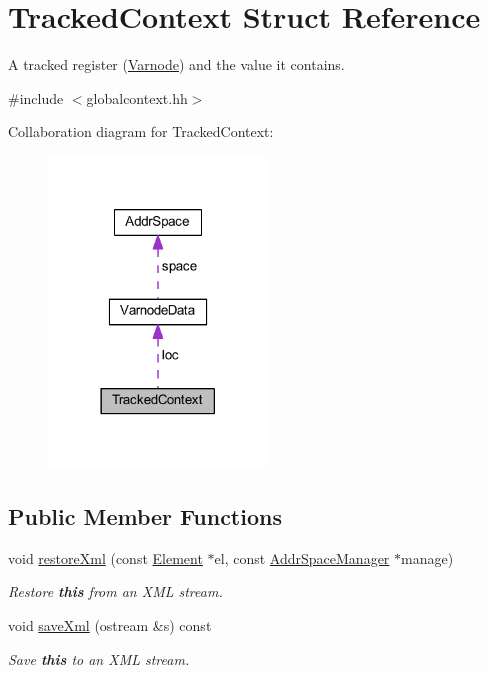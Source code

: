 \hypertarget{struct_tracked_context}{}\section{Tracked\+Context Struct Reference}
\label{struct_tracked_context}


A tracked register (\mbox{\hyperlink{class_varnode}{Varnode}}) and the value it contains.  




{\ttfamily \#include $<$globalcontext.\+hh$>$}



Collaboration diagram for Tracked\+Context\+:
\nopagebreak
\begin{figure}[H]
\begin{center}
\leavevmode
\includegraphics[width=165pt]{struct_tracked_context__coll__graph}
\end{center}
\end{figure}
\subsection*{Public Member Functions}
\begin{DoxyCompactItemize}
\item 
void \mbox{\hyperlink{struct_tracked_context_acd6122fcdd019c3a1d0be1983400424e}{restore\+Xml}} (const \mbox{\hyperlink{class_element}{Element}} $\ast$el, const \mbox{\hyperlink{class_addr_space_manager}{Addr\+Space\+Manager}} $\ast$manage)
\begin{DoxyCompactList}\small\item\em Restore {\bfseries{this}} from an X\+ML stream. \end{DoxyCompactList}\item 
void \mbox{\hyperlink{struct_tracked_context_a8a8218db31e360cdb0f60ccada0dc709}{save\+Xml}} (ostream \&s) const
\begin{DoxyCompactList}\small\item\em Save {\bfseries{this}} to an X\+ML stream. \end{DoxyCompactList}\end{DoxyCompactItemize}
